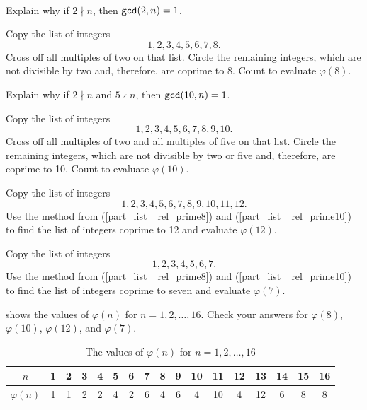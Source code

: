 \begin{act}
\label{act_eulers_phi_function}
~ 
    \begin{actpart}
        \item Explain why if $2 \nmid n$, then $\texttt{gcd}(2,n)=1$.
        \item \label{part_list_ rel_prime8} Copy the list of integers $$1,2,3,4,5,6,7,8.$$
        Cross off all multiples of two on that list. Circle the remaining integers, which are not divisible by two and, therefore, are coprime to 8. Count to evaluate $\varphi(8)$.  
        \item Explain why if $2 \nmid n$ and $5 \nmid n$, then $\texttt{gcd}(10,n)=1$.
        \item \label{part_list_ rel_prime10} Copy the list of integers $$1,2,3,4,5,6,7,8,9,10.$$
        Cross off all multiples of two and all multiples of five on that list. Circle the remaining integers, which are not divisible by two or five and, therefore, are  coprime to 10. Count to evaluate $\varphi(10)$. 
        \item Copy the list of integers $$1,2,3,4,5,6,7,8,9,10,11,12.$$
        Use the method from (\ref{part_list_ rel_prime8}) and (\ref{part_list_ rel_prime10}) to find the list of integers coprime to 12 and evaluate $\varphi(12)$. 
        \item Copy the list of integers $$1,2,3,4,5,6,7.$$
        Use the method from (\ref{part_list_ rel_prime8}) and (\ref{part_list_ rel_prime10}) to find the list of integers coprime to seven and evaluate $\varphi(7)$. 
        \item {} shows the values of $\varphi(n)$ for $n=1,2,\ldots, 16$.  Check your answers for $\varphi(8)$, $\varphi(10)$, $\varphi(12)$, and $\varphi(7)$.

            \begin{table}[hbtp]
            \centering
                \begin{tabular}{c| c|c|c|c | c|c|c|c | c|c|c|c | c|c|c|c }
                    $n$ & 1 & 2 & 3 & 4 & 5 & 6 & 7 & 8 & 9 & 10 & 11 & 12 & 13 & 14 & 15 & 16\\ \hline
                    $\varphi(n)$ & 1 & 1 & 2 & 2 & 4 & 2 & 6 & 4 & 6 & 4 & 10 & 4 & 12 & 6 & 8 & 8 \\ 
                \end{tabular}
            \caption{The values of $\varphi(n)$ for $n=1,2, \ldots, 16$}
            \label{table_euler_phi_1to16}
            \end{table}


\end{actpart}
\end{act}

